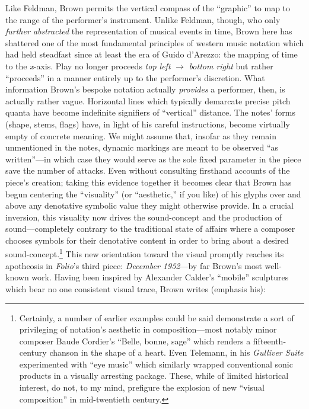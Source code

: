     Like Feldman, Brown permits the vertical compass of the ``graphic'' to map to the range of the performer's instrument. Unlike Feldman, though, who only \textit{further abstracted} the representation of musical events in time, Brown here has shattered one of the most fundamental principles of western music notation which had held steadfast since at least the era of Guido d'Arezzo: the mapping of time to the \textit{x}-axis. Play no longer proceeds \textit{top left} $\rightarrow$ \textit{bottom right} but rather ``proceeds'' in a manner entirely up to the performer's discretion. What information Brown's bespoke notation actually \textit{provides} a performer, then, is actually rather vague. Horizontal lines which typically demarcate precise pitch quanta have become indefinite signifiers of ``vertical'' distance. The notes' forms (shape, stems, flags) have, in light of his careful instructions, become virtually empty of concrete meaning. We might assume that, insofar as they remain unmentioned in the notes, dynamic markings are meant to be observed ``as written''---in which case they would serve as the sole fixed parameter in the piece save the number of attacks. Even without consulting firsthand accounts of the piece's creation; taking this evidence together it becomes clear that Brown has begun centering the ``visuality'' (or ``aesthetic,'' if you like) of his glyphs over and above any denotative symbolic value they might otherwise provide. In a crucial inversion, this visuality now drives the sound-concept and the production of sound---completely contrary to the traditional state of affairs where a composer chooses symbols for their denotative content in order to bring about a desired sound-concept.\footnote{
        Certainly, a number of earlier examples could be said demonstrate a sort of privileging of notation's aesthetic in composition---most notably minor composer Baude Cordier's ``Belle, bonne, sage'' which renders a fifteenth-century chanson in the shape of a heart. Even Telemann, in his \textit{Gulliver Suite} experimented with ``eye music'' which similarly wrapped conventional sonic products in a visually arresting package. These, while of limited historical interest, do not, to my mind, prefigure the explosion of new ``visual composition'' in mid-twentieth century.
        }
    This new orientation toward the visual promptly reaches its apotheosis in \textit{Folio}'s third piece: \textit{December 1952}---by far Brown's most well-known work. Having been inspired by Alexander Calder's ``mobile'' sculptures which bear no one consistent visual trace, Brown writes (emphasis his):

